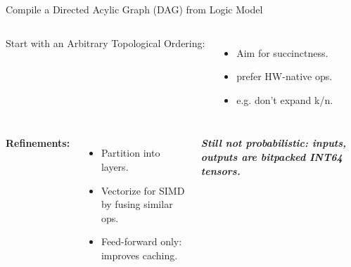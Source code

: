 \begin{frame}{Compile a Directed Acylic Graph (DAG) from Logic Model}
  \begin{columns}

      \par %

      Start with an Arbitrary Topological Ordering:
      \begin{itemize}
          \item {Aim for succinctness.}
          \item {prefer HW-native ops.}
          \item {e.g. don't expand k/n.}
      \end{itemize}
  \end{columns}
\end{frame}

\begin{frame}
  \begin{columns}
    {
        \par
        \vspace{10pt}
        \textbf{Refinements:}
      \begin{itemize}
          \item {Partition into layers.}
          \item {Vectorize for SIMD by fusing similar ops.}
          \item {Feed-forward only: improves caching.}
      \end{itemize}\par
      \vspace{2pt}
      \tiny{\textbf{\emph{Still not probabilistic: inputs, outputs are bitpacked INT64 tensors.}}}
    }
      \par %
  \end{columns}
\end{frame}

